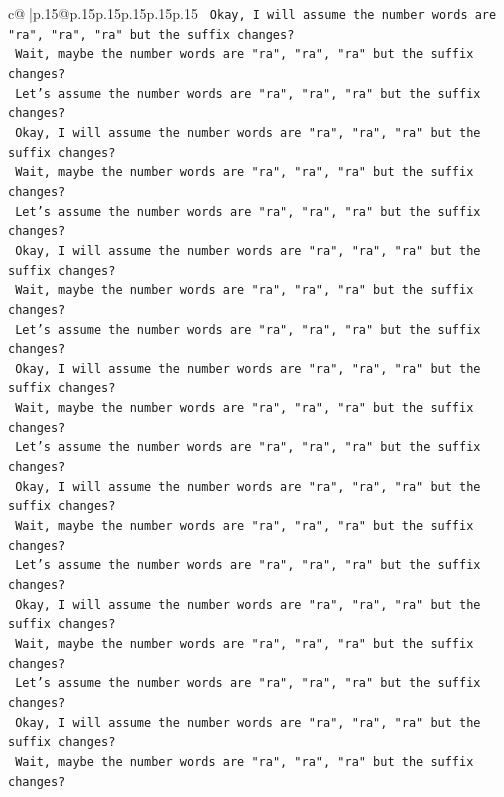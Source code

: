 \documentclass{article}
\begin{document}
{\begin{supertabular}{c@{$\;$}|p{.15\linewidth}@{}p{.15\linewidth}p{.15\linewidth}p{.15\linewidth}p{.15\linewidth}p{.15\linewidth}}
{{{\texttt{    Okay, I will assume the number words are "ra", "ra", "ra" but the suffix changes?} \\
\texttt{    Wait, maybe the number words are "ra", "ra", "ra" but the suffix changes?} \\
\texttt{    Let's assume the number words are "ra", "ra", "ra" but the suffix changes?} \\
\texttt{    Okay, I will assume the number words are "ra", "ra", "ra" but the suffix changes?} \\
\texttt{    Wait, maybe the number words are "ra", "ra", "ra" but the suffix changes?} \\
\texttt{    Let's assume the number words are "ra", "ra", "ra" but the suffix changes?} \\
\texttt{    Okay, I will assume the number words are "ra", "ra", "ra" but the suffix changes?} \\
\texttt{    Wait, maybe the number words are "ra", "ra", "ra" but the suffix changes?} \\
\texttt{    Let's assume the number words are "ra", "ra", "ra" but the suffix changes?} \\
\texttt{    Okay, I will assume the number words are "ra", "ra", "ra" but the suffix changes?} \\
\texttt{    Wait, maybe the number words are "ra", "ra", "ra" but the suffix changes?} \\
\texttt{    Let's assume the number words are "ra", "ra", "ra" but the suffix changes?} \\
\texttt{    Okay, I will assume the number words are "ra", "ra", "ra" but the suffix changes?} \\
\texttt{    Wait, maybe the number words are "ra", "ra", "ra" but the suffix changes?} \\
\texttt{    Let's assume the number words are "ra", "ra", "ra" but the suffix changes?} \\
\texttt{    Okay, I will assume the number words are "ra", "ra", "ra" but the suffix changes?} \\
\texttt{    Wait, maybe the number words are "ra", "ra", "ra" but the suffix changes?} \\
\texttt{    Let's assume the number words are "ra", "ra", "ra" but the suffix changes?} \\
\texttt{    Okay, I will assume the number words are "ra", "ra", "ra" but the suffix changes?} \\
\texttt{    Wait, maybe the number words are "ra", "ra", "ra" but the suffix changes?} \\
}}}
\end{supertabular}}
\end{document}
